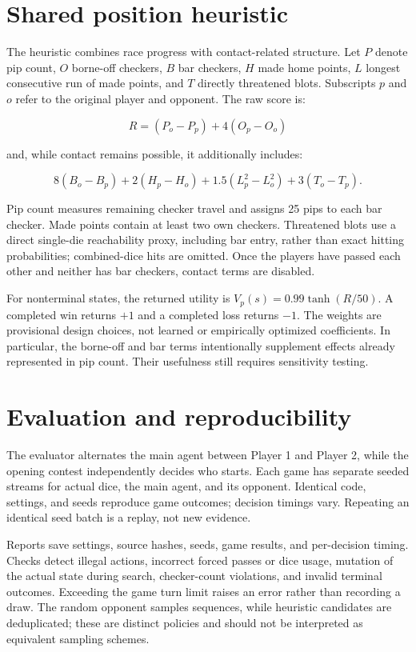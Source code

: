 \section{Shared position heuristic}

The heuristic combines race progress with contact-related structure. Let $P$ denote pip count, $O$ borne-off checkers, $B$ bar checkers, $H$ made home points, $L$ longest consecutive run of made points, and $T$ directly threatened blots. Subscripts $p$ and $o$ refer to the original player and opponent. The raw score is:

\[
R=(P_o-P_p)+4(O_p-O_o)
\]

and, while contact remains possible, it additionally includes:

\[
8(B_o-B_p)+2(H_p-H_o)+1.5(L_p^2-L_o^2)+3(T_o-T_p).
\]

Pip count measures remaining checker travel and assigns 25 pips to each bar checker. Made points contain at least two own checkers. Threatened blots use a direct single-die reachability proxy, including bar entry, rather than exact hitting probabilities; combined-dice hits are omitted. Once the players have passed each other and neither has bar checkers, contact terms are disabled.

For nonterminal states, the returned utility is $V_p(s)=0.99\tanh(R/50)$. A completed win returns $+1$ and a completed loss returns $-1$. The weights are provisional design choices, not learned or empirically optimized coefficients. In particular, the borne-off and bar terms intentionally supplement effects already represented in pip count. Their usefulness still requires sensitivity testing.

\section{Evaluation and reproducibility}

The evaluator alternates the main agent between Player 1 and Player 2, while the opening contest independently decides who starts. Each game has separate seeded streams for actual dice, the main agent, and its opponent. Identical code, settings, and seeds reproduce game outcomes; decision timings vary. Repeating an identical seed batch is a replay, not new evidence.

Reports save settings, source hashes, seeds, game results, and per-decision timing. Checks detect illegal actions, incorrect forced passes or dice usage, mutation of the actual state during search, checker-count violations, and invalid terminal outcomes. Exceeding the game turn limit raises an error rather than recording a draw. The random opponent samples sequences, while heuristic candidates are deduplicated; these are distinct policies and should not be interpreted as equivalent sampling schemes.

